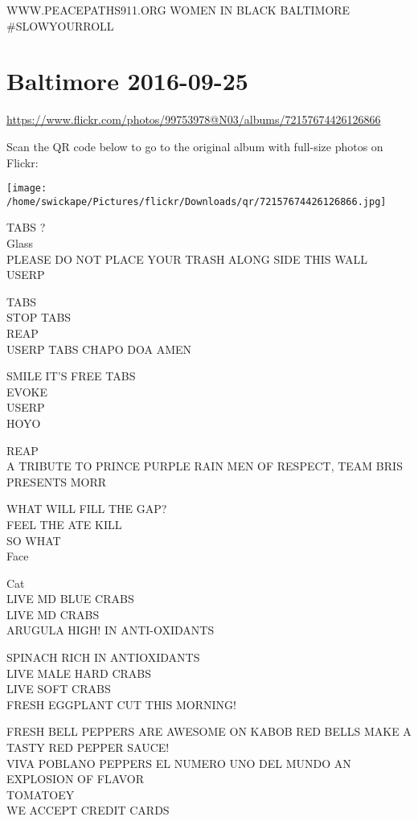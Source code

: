 \documentclass[10pt,letterpaper]{article}
\begin{document}
WWW.PEACEPATHS911.ORG WOMEN IN BLACK BALTIMORE\\
\#SLOWYOURROLL


\section*{Baltimore 2016-09-25}

\url{https://www.flickr.com/photos/99753978@N03/albums/72157674426126866}

Scan the QR code below to go to the original album with full-size photos on Flickr:

\texttt{[image: /home/swickape/Pictures/flickr/Downloads/qr/72157674426126866.jpg]}


TABS ?\\
Glass\\
PLEASE DO NOT PLACE YOUR TRASH ALONG SIDE THIS WALL\\
USERP

TABS\\
STOP TABS\\
REAP\\
USERP TABS CHAPO DOA AMEN

SMILE IT'S FREE TABS\\
EVOKE\\
USERP\\
HOYO

REAP\\
A TRIBUTE TO PRINCE PURPLE RAIN MEN OF RESPECT, TEAM BRIS PRESENTS MORR

WHAT WILL FILL THE GAP?\\
FEEL THE ATE KILL\\
SO WHAT\\
Face

Cat\\
LIVE MD BLUE CRABS\\
LIVE MD CRABS\\
ARUGULA HIGH! IN ANTI{-}OXIDANTS

SPINACH RICH IN ANTIOXIDANTS\\
LIVE MALE HARD CRABS\\
LIVE SOFT CRABS\\
FRESH EGGPLANT CUT THIS MORNING!

FRESH BELL PEPPERS ARE AWESOME ON KABOB RED BELLS MAKE A TASTY RED PEPPER SAUCE!\\
VIVA POBLANO PEPPERS EL NUMERO UNO DEL MUNDO AN EXPLOSION OF FLAVOR\\
TOMATOEY\\
WE ACCEPT CREDIT CARDS
\end{document}

